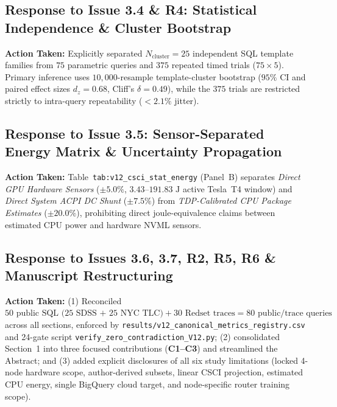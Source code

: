 \documentclass[11pt,a4paper]{article}
\begin{document}
\subsection*{Response to Issue 3.4 \& R4: Statistical Independence \& Cluster Bootstrap}
\textbf{Action Taken:} Explicitly separated $N_{\text{cluster}}=25$ independent SQL template families from $75$ parametric queries and $375$ repeated timed trials ($75\times 5$). Primary inference uses $10{,}000$-resample template-cluster bootstrap ($95\%$ CI and paired effect sizes $d_{z}=0.68$, Cliff's $\delta=0.49$), while the $375$ trials are restricted strictly to intra-query repeatability ($<2.1\%$ jitter).

\subsection*{Response to Issue 3.5: Sensor-Separated Energy Matrix \& Uncertainty Propagation}
\textbf{Action Taken:} Table~\texttt{tab:v12\_csci\_stat\_energy} (Panel~B) separates \emph{Direct GPU Hardware Sensors} ($\pm 5.0\%$, $3.43\text{--}191.83\text{ J}$ active Tesla~T4 window) and \emph{Direct System ACPI DC Shunt} ($\pm 7.5\%$) from \emph{TDP-Calibrated CPU Package Estimates} ($\pm 20.0\%$), prohibiting direct joule-equivalence claims between estimated CPU power and hardware NVML sensors.

\subsection*{Response to Issues 3.6, 3.7, R2, R5, R6 \& Manuscript Restructuring}
\textbf{Action Taken:} (1) Reconciled $50\text{ public SQL (25 SDSS + 25 NYC TLC)} + 30\text{ Redset traces} = 80\text{ public/trace queries}$ across all sections, enforced by \texttt{results/v12\_canonical\_metrics\_registry.csv} and 24-gate script \texttt{verify\_zero\_contradiction\_V12.py}; (2) consolidated Section~1 into three focused contributions (\textbf{C1--C3}) and streamlined the Abstract; and (3) added explicit disclosures of all six study limitations (locked 4-node hardware scope, author-derived subsets, linear CSCI projection, estimated CPU energy, single BigQuery cloud target, and node-specific router training scope).
\end{document}
